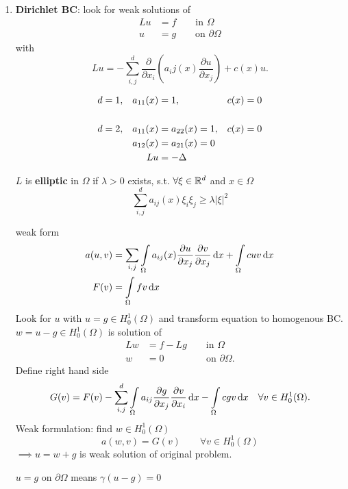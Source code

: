 \begin{enumerate}[=(\alph*)]
	\item \textbf{Dirichlet BC}:\enter
	look for weak solutions of 
	\begin{align*}
		Lu &= f \qquad \text{in } \Omega\\
		 u &= g \qquad \text{on } \partial \Omega
	\end{align*}
	with 
	\begin{equation*}
		Lu = - \displaystyle \sum^d_{i,j} \frac{\partial}{\partial x_i} \left(  a_ij(x) \frac{\partial u}{\partial x_j} \right) + c(x)u.
	\end{equation*}
	\begin{example}
		\begin{align*}
			d &= 1,&   a_{11}(x)&=1,              & c(x)&=0 \\
			  &    &            &				  &     &  \\
			d &= 2,&   a_{11}(x)&= a_{22}(x) = 1, & c(x)&=0 \\ 
			  &    &   a_{12}(x)&= a_{21}(x) = 0  &     &   \\
		  	  &    &         Lu &= -\Delta      &     &   \\
		\end{align*}
	\end{example}
	\begin{definition_}
		$L$ is \textbf{elliptic} in $\Omega$ if $\lambda > 0$ exists, s.t. $\forall \xi \in \mathbb{R}^d$ and  $x \in \Omega$
		\begin{equation*}
			\displaystyle \sum^d_{i,j} a_{ij}(x)\xi_i\xi_j \geq \lambda |\xi|^2
		\end{equation*}
	\end{definition_}
	weak form 
	\begin{align*}
		a(u,v) &= \displaystyle \sum_{i,j} \int \limits_\Omega a_{ij}(x)\frac{\partial u}{\partial x_j} \frac{\partial v}{\partial x_j} \mathop{}\!\mathrm{d} x + \int \limits_\Omega cuv \mathop{}\!\mathrm{d} x \\
		F(v)&= \int \limits_\Omega fv \mathop{}\!\mathrm{d} x
	\end{align*}
	Look for $u$ with $u = g \in H^1_0(\Omega)$ and transform equation to homogenous BC. $w = u - g \in H^1_0(\Omega)$ is solution of 
	\begin{align*}
		Lw &= f -Lg \qquad \text{in } \Omega\\
		 w &= 0 \qquad \qquad \ \,\text{on } \partial\Omega.
	\end{align*}
	Define right hand side
	\begin{equation*}
		G(v) = F(v) - \displaystyle \sum^d_{i,j} \int \limits_\Omega a_{ij} \frac{\partial g}{\partial x_j}\frac{\partial v}{\partial x_i} \mathop{}\!\mathrm{d} x - \int \limits_\Omega cgv \mathop{}\!\mathrm{d} x \quad \forall v\in H^1_0(\Omega).
	\end{equation*}
	Weak formulation: find $w\in H^1_0(\Omega)$ 
	\begin{equation*}
		a(w,v) = G(v) \qquad \forall v \in H^1_0(\Omega)
	\end{equation*}
	$\implies u = w +g$ is weak solution of original problem.
	\begin{comment_}
		$u = g $ on $\partial \Omega$ means $\gamma(u-g) = 0$
	\end{comment_}


\end{enumerate}
